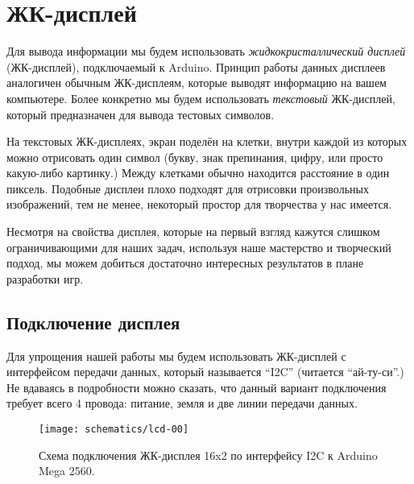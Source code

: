 \documentclass[../sparc.tex]{subfiles}
\begin{document}
\section{ЖК-дисплей}

Для вывода информации мы будем использовать \emph{жидкокристаллический дисплей}
(ЖК-дисплей), подключаемый к Arduino.  Принцип работы данных дисплеев аналогичен
обычным ЖК-дисплеям, которые выводят информацию на вашем компьютере.  Более
конкретно мы будем использовать \emph{текстовый} ЖК-дисплей, который
предназначен для вывода тестовых символов.

На текстовых ЖК-дисплеях, экран поделён на клетки, внутри каждой из которых
можно отрисовать один символ (букву, знак препинания, цифру, или просто
какую-либо картинку.)  Между клетками обычно находится расстояние в один
пиксель.  Подобные дисплеи плохо подходят для отрисовки произвольных
изображений, тем не менее, некоторый простор для творчества у нас имеется.

Несмотря на свойства дисплея, которые на первый взгляд кажутся слишком
ограничивающими для наших задач, используя наше мастерство и творческий подход,
мы можем добиться достаточно интересных результатов в плане разработки игр.

\subsection{Подключение дисплея}

Для упрощения нашей работы мы будем использовать ЖК-дисплей с интерфейсом
передачи данных, который называется ``I2C'' (читается ``ай-ту-си''.)  Не
вдаваясь в подробности можно сказать, что данный вариант подключения требует
всего 4 провода: питание, земля и две линии передачи данных.

\begin{figure}[ht]
  \centering
  \texttt{[image: schematics/lcd-00]}
  \caption{Схема подключения ЖК-дисплея 16x2 по интерфейсу I2C к Arduino Mega
    2560.}
  \label{fig:lcd-00}
\end{figure}
\end{document}
